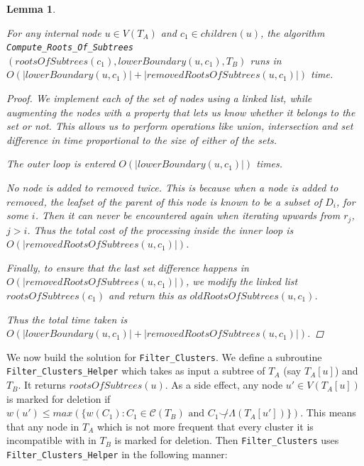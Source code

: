 \documentclass{article}
\newcommand{\compatible}{\smile}
\newcommand{\leafset}{\Lambda}
\newtheorem{computerootsofsubtreesruntime}[incompatibility]{Lemma}
\begin{document}
    \begin{computerootsofsubtreesruntime}
        \label{lem:computerootsofsubtreesruntime}

        For any internal node $u \in V(T_A)$ and $c_1 \in children(u)$, the algorithm\\ %
        \texttt{Compute\_Roots\_Of\_Subtrees}$(rootsOfSubtrees(c_1), lowerBoundary(u, c_1), T_B)$ runs in\\ %
        $O(|lowerBoundary(u, c_1)| + |removedRootsOfSubtrees(u, c_1)|)$ time.

        \begin{proof}
            We implement each of the set of nodes using a linked list, while augmenting the nodes with a property that lets us know whether it belongs to the set or not. This allows us to perform operations like union, intersection and set difference in time proportional to the size of either of the sets.

            The outer loop is entered $O(|lowerBoundary(u, c_1)|)$ times.

            No node is added to $removed$ twice. This is because when a node is added to $removed$, the leafset of the parent of this node is known to be a subset of $D_i$, for some $i$. Then it can never be encountered again when iterating upwards from $r_j$, $j > i$. Thus the total cost of the processing inside the inner loop is $O(|removedRootsOfSubtrees(u, c_1)|)$.

            Finally, to ensure that the last set difference happens in $O(|removedRootsOfSubtrees(u, c_1)|)$, we modify the linked list $rootsOfSubtrees(c_1)$ and return this as $oldRootsOfSubtrees(u, c_1)$.

            Thus the total time taken is $O(|lowerBoundary(u, c_1)| + |removedRootsOfSubtrees(u, c_1)|)$.
        \end{proof}
    \end{computerootsofsubtreesruntime}

    We now build the solution for \texttt{Filter\_Clusters}. We define a subroutine \texttt{Filter\_Clusters\_Helper} which takes as input a subtree of $T_A$ (say $T_A[u]$) and $T_B$. It returns $rootsOfSubtrees(u)$. As a side effect, any node $u' \in V(T_A[u])$ is marked for deletion if $w(u') \leq max(\{w(C_1) : C_1 \in \mathcal{C}(T_B) \text{ and } C_1 \not\compatible \leafset(T_A[u'])\})$. This means that any node in $T_A$ which is not more frequent that every cluster it is incompatible with in $T_B$ is marked for deletion. Then \texttt{Filter\_Clusters} uses \texttt{Filter\_Clusters\_Helper} in the following manner:
\end{document}
